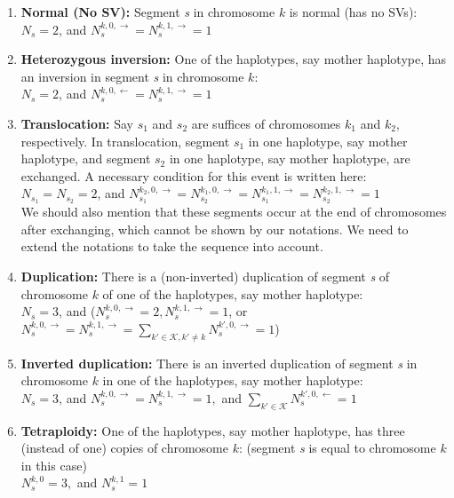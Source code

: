 \documentclass[12pt]{article}
\newcommand{\CN}{N} %
\newcommand{\chr}{k}
\newcommand{\Chr}{\mathcal{K}}
\begin{document}
\begin{enumerate}
\item \textbf{Normal (No SV):} Segment \textit{s} in chromosome $\chr$ is normal (has no SVs):\\
$\CN_s = 2$, and $\CN_s^{\chr,0,\rightarrow} = \CN_s^{\chr,1,\rightarrow} = 1$

\item \textbf{Heterozygous inversion:} One of the haplotypes, say mother haplotype, has an inversion in segment \textit{s} in chromosome $\chr$:\\
$\CN_s = 2$, and $\CN_s^{\chr,0,\leftarrow} = \CN_s^{\chr,1,\rightarrow} = 1$

\item \textbf{Translocation:} Say $s_1$ and $s_2$ are suffices of chromosomes $\chr_1$ and $\chr_2$, respectively. In translocation, segment $s_1$ in one haplotype, say mother haplotype, and segment $s_2$ in one haplotype, say mother haplotype, are exchanged. A necessary condition for this event is written here:\\
$\CN_{s_1} = \CN_{s_2} = 2$, and $\CN_{s_1}^{\chr_2, 0, \rightarrow} = \CN_{s_2}^{\chr_1, 0, \rightarrow} = \CN_{s_1}^{\chr_1, 1, \rightarrow} = \CN_{s_2}^{\chr_2, 1, \rightarrow} = 1$\\
We should also mention that these segments occur at the end of chromosomes after exchanging, which cannot be shown by our notations. We need to extend the notations to take the sequence into account.
	
\item \textbf{Duplication:} There is a (non-inverted) duplication of segment \textit{s} of chromosome $\chr$ of one of the haplotypes, say mother haplotype:\\
$\CN_s = 3$, and ($\CN_s^{\chr,0,\rightarrow} = 2, \CN_s^{\chr,1,\rightarrow} = 1$, or
$\CN_s^{\chr,0,\rightarrow} = \CN_s^{\chr,1,\rightarrow} = \sum \limits_{\chr' \in \Chr, \chr' \neq \chr} \CN_s^{\chr', 0, \rightarrow} = 1$)

\item \textbf{Inverted duplication:} There is an inverted duplication of segment \textit{s} in chromosome $\chr$ in one of the haplotypes, say mother haplotype:\\
$\CN_s = 3$, and $\CN_s^{\chr,0,\rightarrow} = \CN_s^{\chr,1,\rightarrow} = 1,$ and $\sum \limits_{\chr' \in \Chr} \CN_s^{\chr', 0, \leftarrow} = 1$

\item \textbf{Tetraploidy:} One of the haplotypes, say mother haplotype, has three (instead of one) copies of chromosome $\chr$: (segment \textit{s} is equal to chromosome $\chr$ in this case)\\
$\CN_s^{\chr,0} = 3,$ and $\CN_s^{\chr,1} = 1$


\end{enumerate}
\end{document}
